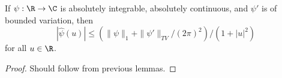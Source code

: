 \begin{lemma}
\label{decay-alt}
\leanok
If $\psi:\R \to \C$ is absolutely
integrable, absolutely continuous, and $\psi'$ is of bounded variation, then
$$ |\hat \psi(u)| \leq ( \|\psi\|_1 + \| \psi' \|_{TV} / (2\pi)^2) / (1+|u|^2)$$
for all $u \in \R$.
\end{lemma}
\begin{proof}
\leanok
Should follow from previous lemmas.
\end{proof}
